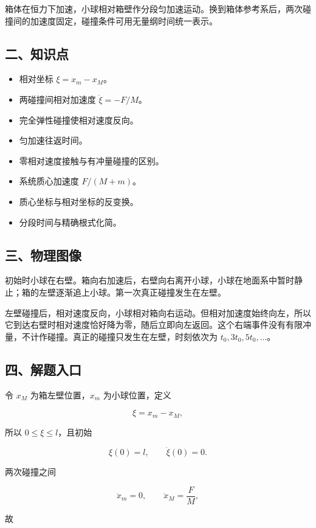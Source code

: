 \documentclass[12pt,a4paper,UTF8]{ctexart}
\newcommand{\tightlist}{\setlength{\itemsep}{0pt}\setlength{\parskip}{0pt}}
\begin{document}
箱体在恒力下加速，小球相对箱壁作分段匀加速运动。换到箱体参考系后，两次碰撞间的加速度固定，碰撞条件可用无量纲时间统一表示。

\subsection{二、知识点}\label{ux4e8cux77e5ux8bc6ux70b9-7}

\begin{itemize}
\tightlist
\item
  相对坐标 \(\xi=x_m-x_M\)。
\item
  两碰撞间相对加速度 \(\ddot\xi=-F/M\)。
\item
  完全弹性碰撞使相对速度反向。
\item
  匀加速往返时间。
\item
  零相对速度接触与有冲量碰撞的区别。
\item
  系统质心加速度 \(F/(M+m)\)。
\item
  质心坐标与相对坐标的反变换。
\item
  分段时间与精确根式化简。
\end{itemize}

\subsection{三、物理图像}\label{ux4e09ux7269ux7406ux56feux50cf-7}

初始时小球在右壁。箱向右加速后，右壁向右离开小球，小球在地面系中暂时静止；箱的左壁逐渐追上小球。第一次真正碰撞发生在左壁。

左壁碰撞后，相对速度反向，小球相对箱向右运动。但相对加速度始终向左，所以它到达右壁时相对速度恰好降为零，随后立即向左返回。这个右端事件没有有限冲量，不计作碰撞。真正的碰撞只发生在左壁，时刻依次为
\(t_0,3t_0,5t_0,\ldots\)。

\subsection{四、解题入口}\label{ux56dbux89e3ux9898ux5165ux53e3-7}

令 \(x_M\) 为箱左壁位置，\(x_m\) 为小球位置，定义

\[\xi=x_m-x_M,\]

所以 \(0\le\xi\le l\)，且初始

\[\xi(0)=l,\qquad\dot\xi(0)=0.\]

两次碰撞之间

\[\ddot x_m=0,\qquad\ddot x_M=\frac FM,\]

故
\end{document}
